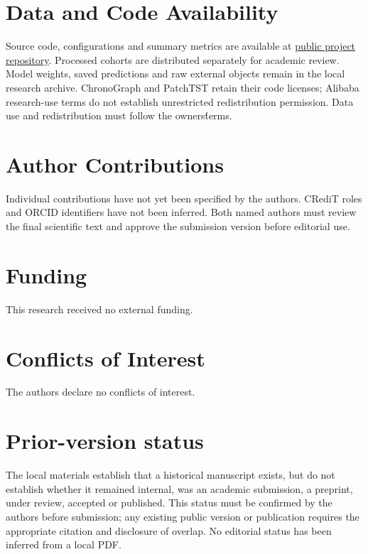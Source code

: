 \section*{Data and Code Availability}
Source code, configurations and summary metrics are available at \href{https://github.com/Nunclear/prediccion-proactiva-de-recursos-computacionales-para-microservicios}{public project repository}. Processed cohorts are distributed separately for academic review. Model weights, saved predictions and raw external objects remain in the local research archive. ChronoGraph and PatchTST retain their code licenses; Alibaba research-use terms do not establish unrestricted redistribution permission. Data use and redistribution must follow the owners\' terms.

\section*{Author Contributions}
Individual contributions have not yet been specified by the authors. CRediT roles and ORCID identifiers have not been inferred. Both named authors must review the final scientific text and approve the submission version before editorial use.
\section*{Funding}
This research received no external funding.
\section*{Conflicts of Interest}
The authors declare no conflicts of interest.
\section*{Prior-version status}
The local materials establish that a historical manuscript exists, but do not establish whether it remained internal, was an academic submission, a preprint, under review, accepted or published. This status must be confirmed by the authors before submission; any existing public version or publication requires the appropriate citation and disclosure of overlap. No editorial status has been inferred from a local PDF.
